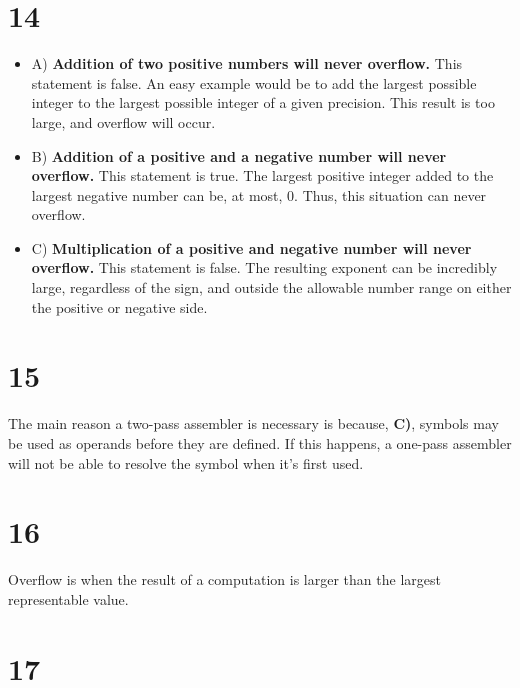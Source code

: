 \documentclass[a4paper,11pt]{article}
\begin{document}

\section*{14}
\begin{itemize}
  \item A) {\bf Addition of two positive numbers will never overflow.}  This statement is false.  An easy example would be to add the largest possible integer to the largest possible integer of a given precision.  This result is too large, and overflow will occur.
  \item B) {\bf Addition of a positive and a negative number will never overflow.}  This statement is true.  The largest positive integer added to the largest negative number can be, at most, 0.  Thus, this situation can never overflow.
  \item C) {\bf Multiplication of a positive and negative number will never overflow.}  This statement is false.  The resulting exponent can be incredibly large, regardless of the sign, and outside the allowable number range on either the positive or negative side.
\end{itemize}


\section*{15}
The main reason a two-pass assembler is necessary is because, {\bf C)}, symbols may be used as operands before they are defined.  If this happens, a one-pass assembler will not be able to resolve the symbol when it's first used. 
 

\section*{16}
Overflow is when the result of a computation is larger than the largest representable value. 


\section*{17}
\end{document}
